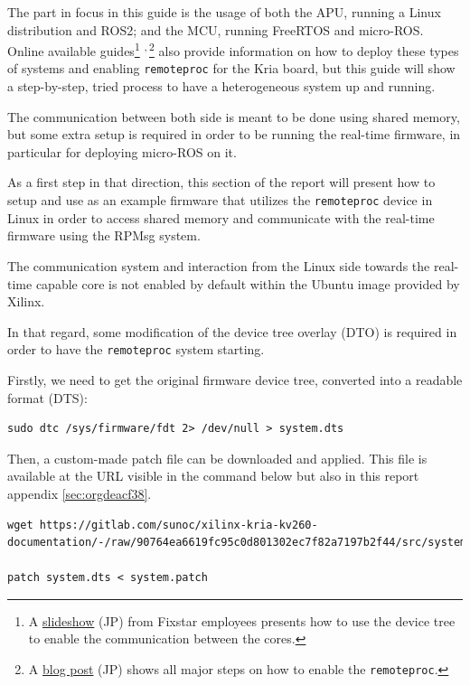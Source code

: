 \documentclass[10pt]{article}
\begin{document}
The part in focus in this guide is the usage of both the APU, running
a Linux distribution and ROS2; and the MCU, running FreeRTOS and micro-ROS.
Online available guides\footnote{A \href{https://speakerdeck.com/fixstars/fpga-seminar-12-fixstars-corporation-20220727}{slideshow} (JP) from Fixstar employees presents how to use the device
tree to enable the communication between the cores.} \textsuperscript{,}\,\footnote{A \href{https://zenn.dev/ryuz88/articles/kv260\_setup\_memo\_ubuntu22 }{blog post} (JP) shows all major steps on how to enable the \texttt{remoteproc}.} also provide information on how to deploy these types
of systems and enabling \texttt{remoteproc} for the Kria board, but this guide
will show a step-by-step, tried process to have a heterogeneous system
up and running.

The communication between both side is meant to be done using shared memory, but
some extra setup is required in order to be running the real-time firmware, in particular
for deploying micro-ROS on it.

As a first step in that direction, this section of the report
will present how to setup and use as an example firmware that utilizes the
\texttt{remoteproc} device in Linux in order to access shared memory
and communicate with the real-time firmware using the RPMsg system.

The communication system and interaction from the Linux side towards the real-time capable core
is not enabled by default within the Ubuntu image provided by Xilinx.

In that regard, some modification of the device tree overlay (DTO) is required in order to have
the \texttt{remoteproc} system starting.

Firstly, we need to get the original firmware device tree, converted
into a readable format (DTS):

\begin{verbatim}
sudo dtc /sys/firmware/fdt 2> /dev/null > system.dts
\end{verbatim}

Then, a custom-made patch file can be downloaded and applied.
This file is available at the URL visible in the command below
but also in this report appendix \ref{sec:orgdeacf38}.

\begin{verbatim}
wget https://gitlab.com/sunoc/xilinx-kria-kv260-documentation/-/raw/90764ea6619fc95c0d801302ec7f82a7197b2f44/src/system.patch

patch system.dts < system.patch
\end{verbatim}
\end{document}
